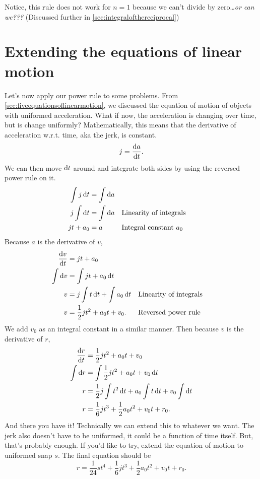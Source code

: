 Notice, this rule does not work for $n = 1$ because we can't divide by zero\dots \emph{or can we???} (Discussed further in \cref{sec:integralofthereciprocal})

\section{Extending the equations of linear motion}

Let's now apply our power rule to some problems. From \cref{sec:fiveequationsoflinearmotion}, we discussed the equation of motion of objects with uniformed acceleration. What if now, the acceleration is changing over time, but is change uniformly? Mathematically, this means that the derivative of acceleration w.r.t. time, aka the jerk, is constant.
\begin{equation*}
    j = \odv{a}{t}.
\end{equation*}
We can then move $\odif{t}$ around and integrate both sides by using the reversed power rule on it.
\begin{align*}
    \int j\odif{t} &= \int\odif{a} \\
    j\int \odif{t} &= \int\odif{a} \alc[0.3]{Linearity of integrals} \\
    jt + a_0 &= a \alc[0.3]{Integral constant $a_0$}
\end{align*}
Because $a$ is the derivative of $v$, 
\begin{align*}
    \odv{v}{t} &= jt + a_0 \\
    \int \odif{v} &= \int jt + a_0 \odif{t} \\
    v &= j\int t\odif{t} + \int a_0\odif{t} \alc{Linearity of integrals} \\
    v &= \frac{1}{2}jt^2 + a_0t + v_0. \alc{Reversed power rule} \\
\end{align*}
We add $v_0$ as an integral constant in a similar manner. Then because $v$ is the derivative of $r$,
\begin{align*}
    \odv{r}{t} &= \frac{1}{2}jt^2 + a_0t + v_0 \\
    \int \odif{r} &= \int\frac{1}{2}jt^2 + a_0t + v_0 \odif{t} \\
    r &= \frac{1}{2}j\int t^2\odif{t} + a_0\int t\odif{t} + v_0\int\odif{t} \\
    r &= \frac{1}{6}jt^3 + \frac{1}{2}a_0t^2 + v_0t + r_0.
\end{align*}
And there you have it! Technically we can extend this to whatever we want. The jerk also doesn't have to be uniformed, it could be a function of time itself. But, that's probably enough. If you'd like to try, extend the equation of motion to uniformed snap $s$. The final equation should be
\begin{equation*}
    r = \frac{1}{24}st^4 + \frac{1}{6}jt^3 + \frac{1}{2}a_0t^2 + v_0t + r_0.
\end{equation*}


